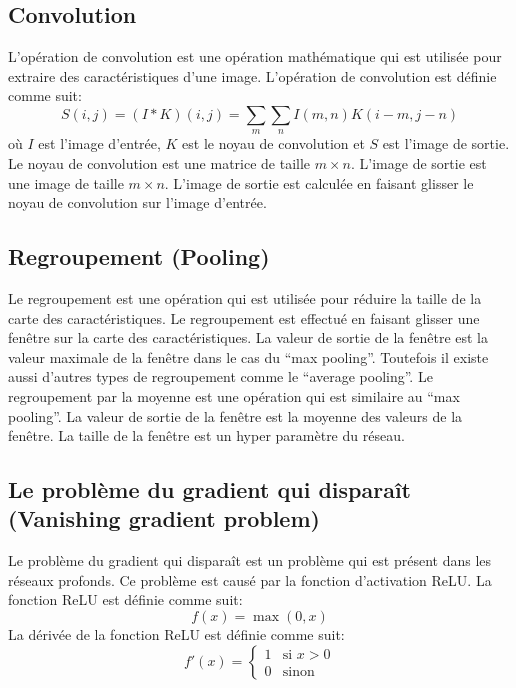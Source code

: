 \documentclass{article}
\begin{document}
\subsection{Convolution}
L'opération de convolution est une opération mathématique qui est utilisée pour extraire des caractéristiques d'une image.
L'opération de convolution est définie comme suit:
\begin{equation}
    S(i, j) = (I * K)(i, j) = \sum_{m} \sum_{n} I(m, n)K(i - m, j - n)
\end{equation}
où $I$ est l'image d'entrée, $K$ est le noyau de convolution et $S$ est l'image de sortie.
Le noyau de convolution est une matrice de taille $m \times n$.
L'image de sortie est une image de taille $m \times n$.
L'image de sortie est calculée en faisant glisser le noyau de convolution sur l'image d'entrée.


\subsection{Regroupement (Pooling)}
Le regroupement est une opération qui est utilisée pour réduire la taille de la carte des caractéristiques.
Le regroupement est effectué en faisant glisser une fenêtre sur la carte des caractéristiques.
La valeur de sortie de la fenêtre est la valeur maximale de la fenêtre dans le cas du ``max pooling''.
Toutefois il existe aussi d'autres types de regroupement comme le ``average pooling''.
Le regroupement par la moyenne est une opération qui est similaire au ``max pooling''.
La valeur de sortie de la fenêtre est la moyenne des valeurs de la fenêtre.
La taille de la fenêtre est un hyper paramètre du réseau.

\subsection{Le problème du gradient qui disparaît (Vanishing gradient problem)}
Le problème du gradient qui disparaît est un problème qui est présent dans les réseaux profonds.
Ce problème est causé par la fonction d'activation ReLU.\@
La fonction ReLU est définie comme suit:
\begin{equation}
    f(x) = \max(0, x)
\end{equation}
La dérivée de la fonction ReLU est définie comme suit:
\begin{equation}
    f'(x) = \begin{cases}
        1 & \text{si } x > 0 \\
        0 & \text{sinon}
    \end{cases}
\end{equation}
\end{document}
